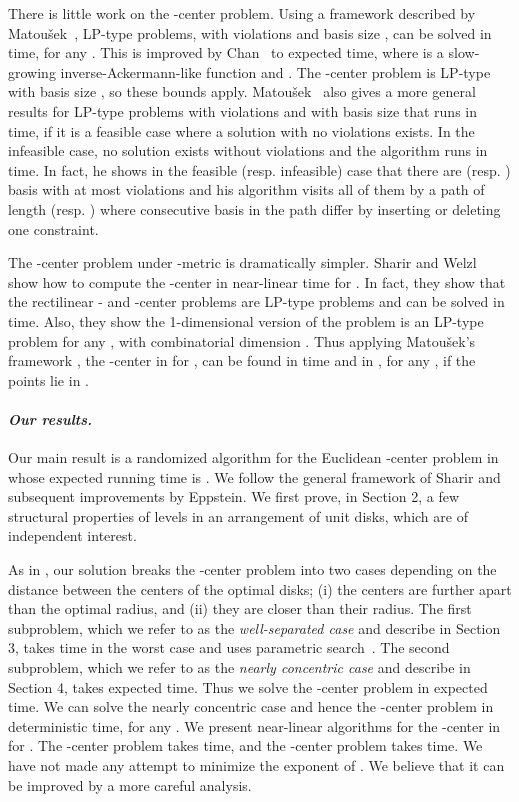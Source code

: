 \documentclass[11pt]{myclass}
\begin{document}
There is little work on the -center problem.
Using a framework described by Matou\v{s}ek~\cite{Mat95}, LP-type problems, with  violations and basis size , can be solved in  time, for any .  This is improved by Chan~\cite{Cha05} to  expected time, where  is a slow-growing inverse-Ackermann-like function and .  
The -center problem is LP-type with basis size , so these bounds apply.  
Matou\v{s}ek~\cite{Mat95} also gives a more general results for LP-type problems with  violations and with basis size  that runs in  time, if it is a feasible case where a solution with no violations exists.  In the infeasible case, no solution exists without violations and the algorithm runs in  time.  In fact, he shows in the feasible (resp. infeasible) case that there are  (resp. ) basis with at most  violations and his algorithm visits all of them by a path of length  (resp. ) where consecutive basis in the path differ by inserting or deleting one constraint.  


The -center problem under -metric is dramatically simpler.  
Sharir and Welzl~\cite{SW96} show how to compute the  -center in near-linear time for .  In fact, they show that the rectilinear - and -center problems are LP-type problems and can be solved in  time.  Also, they show the 1-dimensional version of the problem is an LP-type problem for any , with combinatorial dimension .  Thus applying Matou\v{s}ek's framework \cite{Mat95}, the  -center in  for , can be found in  time and in , for any , if the points lie in .  



\paragraph{\textbf{\emph{Our results.}}}
Our main result is a randomized algorithm for the Euclidean -center problem in  whose expected running time is .  
We follow the general framework of Sharir and subsequent improvements by Eppstein.  
We first prove, in Section 2, a few  structural properties of levels in an arrangement of unit disks, which are of independent interest.  

As in \cite{Sha97,Epp97}, our solution breaks the -center problem into two cases depending on the distance between the centers of the optimal disks; 
(i) the centers are further apart than the optimal radius, and 
(ii) they are closer than their radius.  The first subproblem, which we refer to as the \emph{well-separated case} and describe in Section 3, takes  time in the worst case and uses parametric search~\cite{Meg83}.  The second subproblem, which we refer to as the \emph{nearly concentric case} and describe in Section 4, takes  expected time.  Thus we solve the -center problem in  expected time.  
We can solve the nearly concentric case and hence the -center problem in  deterministic time, for any .  
We present near-linear algorithms for the  -center in  for .  The  -center problem takes  time, and the  -center problem takes  time.  
We have not made any attempt to minimize the exponent of .  We believe that it can be improved by a more careful analysis.  
\end{document}
